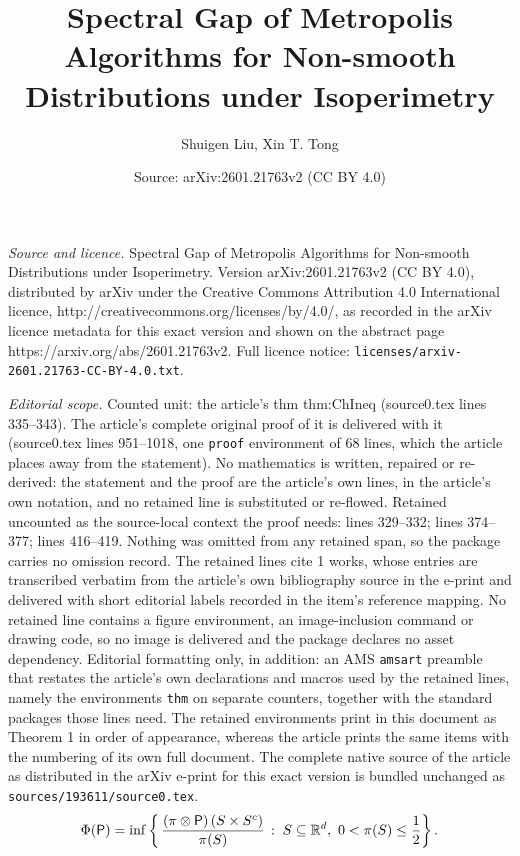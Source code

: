 \documentclass[10pt,a4paper]{amsart}
\title{Spectral Gap of Metropolis Algorithms for Non-smooth Distributions under Isoperimetry}
\author{Shuigen Liu, Xin T. Tong}
\date{Source: arXiv:2601.21763v2 (CC BY 4.0)}
\newcommand{\Brac}[1]{\left(#1\right)}
\newcommand{\mR}{\mathbb{R}}
\newcommand{\matc}{^{\rm c}}
\newcommand{\sfP}{\mathsf{P}}
\begin{document}
\maketitle

\noindent\emph{Source and licence.} Spectral Gap of Metropolis Algorithms for Non-smooth Distributions under Isoperimetry. Version arXiv:2601.21763v2 (CC BY 4.0), distributed by arXiv under the Creative Commons Attribution 4.0 International licence, http://creativecommons.org/licenses/by/4.0/, as recorded in the arXiv licence metadata for this exact version and shown on the abstract page https://arxiv.org/abs/2601.21763v2. Full licence notice: \texttt{licenses/arxiv-2601.21763-CC-BY-4.0.txt}.\par\smallskip

\noindent\textit{Editorial scope.} Counted unit: the article's thm thm:ChIneq (source0.tex lines 335--343). The article's complete original proof of it is delivered with it (source0.tex lines 951--1018, one \texttt{proof} environment of 68 lines, which the article places away from the statement). No mathematics is written, repaired or re-derived: the statement and the proof are the article's own lines, in the article's own notation, and no retained line is substituted or re-flowed.  Retained uncounted as the source-local context the proof needs: lines 329--332; lines 374--377; lines 416--419.  Nothing was omitted from any retained span, so the package carries no omission record.  The retained lines cite 1 works, whose entries are transcribed verbatim from the article's own bibliography source in the e-print and delivered with short editorial labels recorded in the item's reference mapping.  No retained line contains a figure environment, an image-inclusion command or drawing code, so no image is delivered and the package declares no asset dependency.  Editorial formatting only, in addition: an AMS \texttt{amsart} preamble that restates the article's own declarations and macros used by the retained lines, namely the environments \texttt{thm} on separate counters, together with the standard packages those lines need.  The retained environments print in this document as Theorem 1 in order of appearance, whereas the article prints the same items with the numbering of its own full document.  The complete native source of the article as distributed in the arXiv e-print for this exact version is bundled unchanged as \texttt{sources/193611/source0.tex}.
\begin{equation}
\label{eqn:Cond}
    \Phi(\sfP) = \inf \left\{ \, \frac{ \Brac{\pi \otimes \sfP } (S \times S\matc)}{\pi(S)} \, :\; S \subseteq \mR^d,~ 0 < \pi(S) \le \frac{1}{2} \right\}.
\end{equation}
\end{document}
